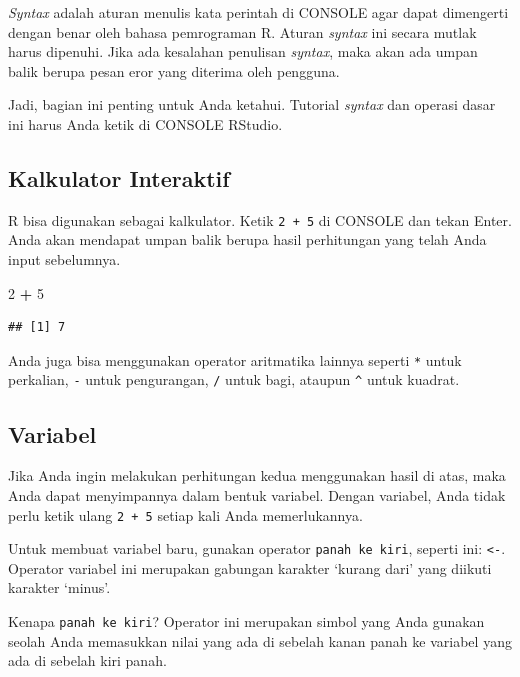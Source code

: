 \documentclass[openany]{book}
\newenvironment{Shaded}{\begin{snugshade}}{\end{snugshade}}
\newcommand{\DecValTok}[1]{\textcolor[rgb]{0.00,0.00,0.81}{#1}}
\newcommand{\StringTok}[1]{\textcolor[rgb]{0.31,0.60,0.02}{#1}}
\newcommand{\OperatorTok}[1]{\textcolor[rgb]{0.81,0.36,0.00}{\textbf{#1}}}
\begin{document}
\emph{Syntax} adalah aturan menulis kata perintah di CONSOLE agar dapat
dimengerti dengan benar oleh bahasa pemrograman R. Aturan \emph{syntax}
ini secara mutlak harus dipenuhi. Jika ada kesalahan penulisan
\emph{syntax}, maka akan ada umpan balik berupa pesan eror yang diterima
oleh pengguna.

Jadi, bagian ini penting untuk Anda ketahui. Tutorial \emph{syntax} dan
operasi dasar ini harus Anda ketik di CONSOLE RStudio.

\hypertarget{kalkulator-interaktif}{\subsection{Kalkulator
Interaktif}\label{kalkulator-interaktif}}

R bisa digunakan sebagai kalkulator. Ketik \texttt{2\ +\ 5} di CONSOLE
dan tekan Enter. Anda akan mendapat umpan balik berupa hasil perhitungan
yang telah Anda input sebelumnya.

\begin{Shaded}
\begin{Highlighting}[]
\DecValTok{2} \OperatorTok{+}\StringTok{ }\DecValTok{5}
\end{Highlighting}
\end{Shaded}

\begin{verbatim}
## [1] 7
\end{verbatim}

Anda juga bisa menggunakan operator aritmatika lainnya seperti
\texttt{*} untuk perkalian, \texttt{-} untuk pengurangan, \texttt{/}
untuk bagi, ataupun \texttt{\^{}} untuk kuadrat.

\subsection{Variabel}\label{variabel}

Jika Anda ingin melakukan perhitungan kedua menggunakan hasil di atas,
maka Anda dapat menyimpannya dalam bentuk variabel. Dengan variabel,
Anda tidak perlu ketik ulang \texttt{2\ +\ 5} setiap kali Anda
memerlukannya.

Untuk membuat variabel baru, gunakan operator \texttt{panah\ ke\ kiri},
seperti ini: \texttt{\textless{}-}. Operator variabel ini merupakan
gabungan karakter `kurang dari' yang diikuti karakter `minus'.

Kenapa \texttt{panah\ ke\ kiri}? Operator ini merupakan simbol yang Anda
gunakan seolah Anda memasukkan nilai yang ada di sebelah kanan panah ke
variabel yang ada di sebelah kiri panah.
\end{document}
